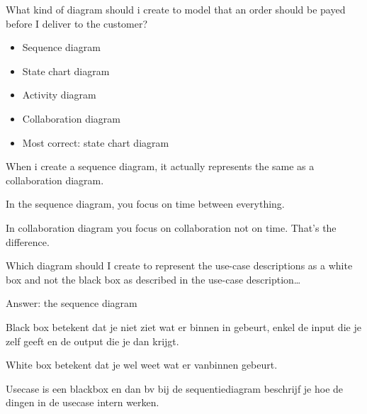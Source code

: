 \begin{question}
What kind of diagram should i create to model that an order should be payed before I deliver to the customer?
\end{question}

\begin{solution}[print]

\begin{itemize}
    \item Sequence diagram
    \item State chart diagram
    \item Activity diagram
    \item Collaboration diagram
    \item Most correct: state chart diagram
\end{itemize}


\end{solution}



\begin{question}
When i create a sequence diagram, it actually represents the same as a collaboration diagram.
\end{question}

\begin{solution}[print]
In the sequence diagram, you focus on time between everything.

In collaboration diagram you focus on collaboration not on time. That’s the difference.
\end{solution}



\begin{question}
Which diagram should I create to represent the use-case descriptions as a white box and not the black box as described in the use-case description…
\end{question}

\begin{solution}[print]
Answer: the sequence diagram

Black box betekent dat je niet ziet wat er binnen in gebeurt, enkel de input die je zelf geeft en de output die je dan krijgt.

White box betekent dat je wel weet wat er vanbinnen gebeurt.

Usecase is een blackbox en dan bv bij de sequentiediagram beschrijf je hoe de dingen in de usecase intern werken.
\end{solution}




